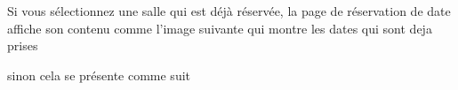 \documentclass{article}
\begin{document}
\begin{enumerate}
  
  Si vous sélectionnez une salle qui est déjà réservée, la page de réservation de date affiche son contenu comme l'image suivante qui montre les dates qui sont deja prises
  
  
  
  \vspace{0.7cm}
   
\hspace*{-0.7in}
               \noindent{}  
  
  sinon cela se présente comme suit
  
  
  
               \vspace{0.7cm}
               \hspace*{-0.7in}
               \noindent{}
  

\end{enumerate}
\end{document}
